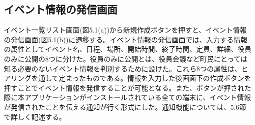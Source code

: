 \subsection{イベント情報の発信画面}%
イベント一覧リスト画面(図5.1(a))から新規作成ボタンを押すと、イベント情報の発信画面(図5.1(b))に遷移する。イベント情報の発信画面では、入力する情報の属性としてイベント名、日程、場所、開始時間、終了時間、定員、詳細、役員のみに公開の8つに分けた。役員のみに公開とは、役員会議など町民にとっては知る必要のないイベント情報を判別するために設けた。これら8つの属性は、ヒアリングを通して定まったものである。情報を入力した後画面下の作成ボタンを押すことでイベント情報を発信することが可能となる。また、ボタンが押された際に本アプリケーションがインストールされている全ての端末に、イベント情報が発信されたことを伝える通知が行く形式にした。通知機能については、5.6節で詳しく記述する。


